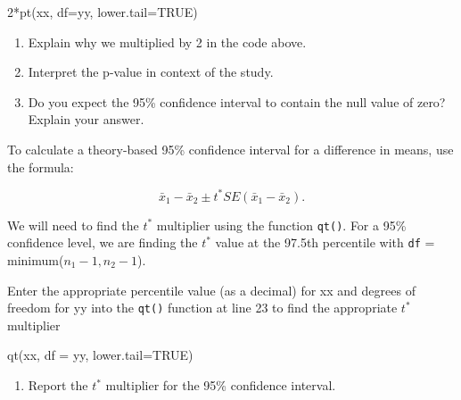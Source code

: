 \documentclass[
]{report}
\newenvironment{Shaded}{\begin{snugshade}}{\end{snugshade}}
\newcommand{\AttributeTok}[1]{\textcolor[rgb]{0.77,0.63,0.00}{#1}}
\newcommand{\ConstantTok}[1]{\textcolor[rgb]{0.00,0.00,0.00}{#1}}
\newcommand{\DecValTok}[1]{\textcolor[rgb]{0.00,0.00,0.81}{#1}}
\newcommand{\FunctionTok}[1]{\textcolor[rgb]{0.00,0.00,0.00}{#1}}
\newcommand{\NormalTok}[1]{#1}
\newcommand{\SpecialCharTok}[1]{\textcolor[rgb]{0.00,0.00,0.00}{#1}}
\providecommand{\tightlist}{%
  \setlength{\itemsep}{0pt}\setlength{\parskip}{0pt}}
\begin{document}
\begin{Shaded}
\begin{Highlighting}[]
\DecValTok{2}\SpecialCharTok{*}\FunctionTok{pt}\NormalTok{(xx, }\AttributeTok{df=}\NormalTok{yy, }\AttributeTok{lower.tail=}\ConstantTok{TRUE}\NormalTok{)}
\end{Highlighting}
\end{Shaded}

\vspace{0.2in}

\begin{enumerate}
\def\labelenumi{\arabic{enumi}.}
\setcounter{enumi}{9}
\item
  Explain why we multiplied by 2 in the code above.
  \vspace{0.3in}
\item
  Interpret the p-value in context of the study.
  \vspace{0.8in}
\item
  Do you expect the 95\% confidence interval to contain the null value of zero? Explain your answer.
  \vspace{0.8in}
\end{enumerate}

To calculate a theory-based 95\% confidence interval for a difference in means, use the formula:

\[\bar{x}_1- \bar{x}_2\pm t^* SE(\bar{x}_1- \bar{x}_2).\]

We will need to find the \(t^*\) multiplier using the function \texttt{qt()}. For a 95\% confidence level, we are finding the \(t^*\) value at the 97.5th percentile with \texttt{df} = minimum(\(n_1 - 1, n_2 - 1\)).

Enter the appropriate percentile value (as a decimal) for xx and degrees of freedom for yy into the \texttt{qt()} function at line 23 to find the appropriate \(t^*\) multiplier

\begin{Shaded}
\begin{Highlighting}[]
\FunctionTok{qt}\NormalTok{(xx, }\AttributeTok{df =}\NormalTok{ yy, }\AttributeTok{lower.tail=}\ConstantTok{TRUE}\NormalTok{)}
\end{Highlighting}
\end{Shaded}

\begin{enumerate}
\def\labelenumi{\arabic{enumi}.}
\setcounter{enumi}{12}
\tightlist
\item
  Report the \(t^*\) multiplier for the 95\% confidence interval.
\end{enumerate}
\end{document}
